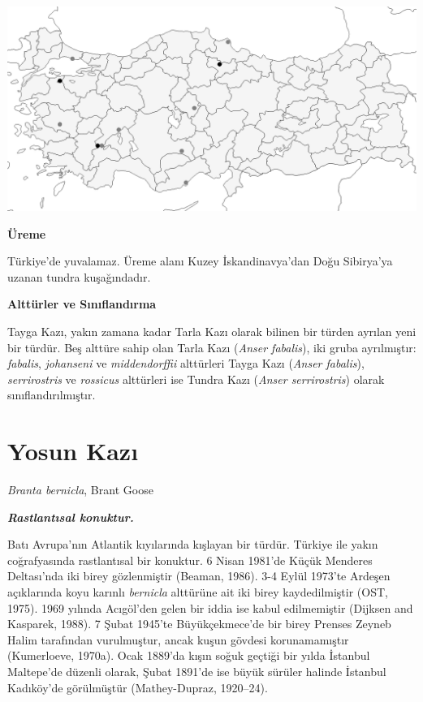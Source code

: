 \documentclass[
  a4paper,
  DIV=11,
  numbers=noendperiod]{scrartcl}
\begin{document}
\includegraphics{images/harita_Anser serrirostris.png}

\textbf{Üreme}

Türkiye'de yuvalamaz. Üreme alanı Kuzey İskandinavya'dan Doğu Sibirya'ya
uzanan tundra kuşağındadır.

\textbf{Alttürler ve Sınıflandırma}

Tayga Kazı, yakın zamana kadar Tarla Kazı olarak bilinen bir türden
ayrılan yeni bir türdür. Beş alttüre sahip olan Tarla Kazı (\emph{Anser
fabalis}), iki gruba ayrılmıştır: \emph{fabalis}, \emph{johanseni} ve
\emph{middendorffii} alttürleri Tayga Kazı (\emph{Anser fabalis}),
\emph{serrirostris} ve \emph{rossicus} alttürleri ise Tundra Kazı
(\emph{Anser serrirostris}) olarak sınıflandırılmıştır.

\section{Yosun Kazı}\label{yosun-kazux131}

\emph{Branta bernicla}, Brant Goose

\textbf{\emph{Rastlantısal konuktur.}}

Batı Avrupa'nın Atlantik kıyılarında kışlayan bir türdür. Türkiye ile
yakın coğrafyasında rastlantısal bir konuktur. 6 Nisan 1981'de Küçük
Menderes Deltası'nda iki birey gözlenmiştir (Beaman, 1986). 3-4 Eylül
1973'te Ardeşen açıklarında koyu karınlı \emph{bernicla} alttürüne ait
iki birey kaydedilmiştir (OST, 1975). 1969 yılında Acıgöl'den gelen bir
iddia ise kabul edilmemiştir (Dijksen and Kasparek, 1988). 7 Şubat
1945'te Büyükçekmece'de bir birey Prenses Zeyneb Halim tarafından
vurulmuştur, ancak kuşun gövdesi korunamamıştır (Kumerloeve, 1970a).
Ocak 1889'da kışın soğuk geçtiği bir yılda İstanbul Maltepe'de düzenli
olarak, Şubat 1891'de ise büyük sürüler halinde İstanbul Kadıköy'de
görülmüştür (Mathey-Dupraz, 1920--24).
\end{document}
